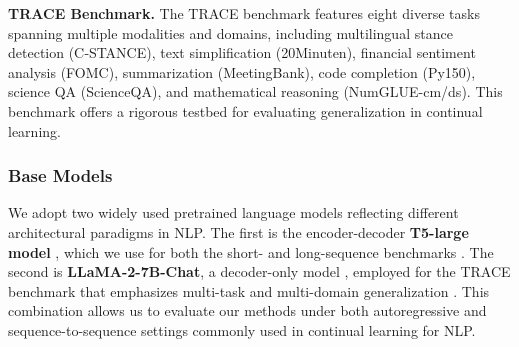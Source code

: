 \documentclass[letterpaper]{article} %
\begin{document}
\textbf{TRACE Benchmark.}  
The TRACE benchmark \cite{wang2023tracecomprehensivebenchmarkcontinual} features eight diverse tasks spanning multiple modalities and domains, including multilingual stance detection (C‑STANCE), text simplification (20Minuten), financial sentiment analysis (FOMC), summarization (MeetingBank), code completion (Py150), science QA (ScienceQA), and mathematical reasoning (NumGLUE-cm/ds). This benchmark offers a rigorous testbed for evaluating generalization in continual learning.






\subsubsection{Base Models}

We adopt two widely used pretrained language models reflecting different architectural paradigms in NLP. The first is the encoder-decoder \textbf{T5-large model} , which we use for both the short- and long-sequence benchmarks . The second is \textbf{LLaMA-2-7B-Chat}, a decoder-only model , employed for the TRACE benchmark that emphasizes multi-task and multi-domain generalization . This combination allows us to evaluate our methods under both autoregressive and sequence-to-sequence settings commonly used in continual learning for NLP.
\end{document}
